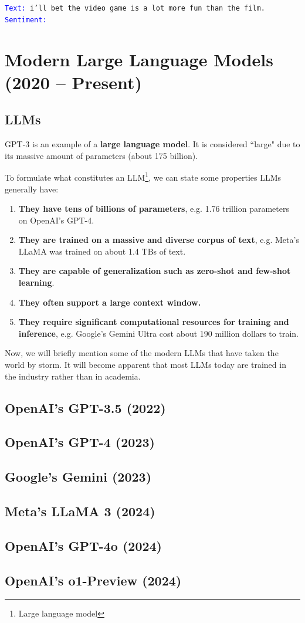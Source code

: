 \documentclass[11pt,twoside]{article}
\begin{document}
\texttt{\textcolor{blue}{Text:} i'll bet the video game is a lot more fun than the film. \\
\textcolor{blue}{Sentiment:}
}

\hrulefill

\section{Modern Large Language Models (2020 -- Present)}
\subsection{LLMs}
GPT-3 is an example of a \textbf{large language model}. It is considered ``large" due to its massive amount of parameters (about 175 billion).

To formulate what constitutes an LLM\footnote{Large language model}, we can state some properties LLMs generally have:
\begin{enumerate}
    \item \textbf{They have tens of billions of parameters}, e.g. 1.76 trillion parameters on OpenAI's GPT-4.
    \item \textbf{They are trained on a massive and diverse corpus of text}, e.g. Meta's LLaMA was trained on about 1.4 TBs of text.
    \item  \textbf{They are capable of generalization such as zero-shot and few-shot learning}.
    \item \textbf{They often support a large context window.}
    \item  \textbf{They require significant computational resources for training and inference}, e.g. Google's Gemini Ultra cost about 190 million dollars to train.
\end{enumerate}

Now, we will briefly mention some of the modern LLMs that have taken the world by storm. It will become apparent that most LLMs today are trained in the industry rather than in academia.

\subsection{OpenAI's GPT-3.5 (2022)}
\subsection{OpenAI's GPT-4 (2023)}
\subsection{Google's Gemini (2023)}
\subsection{Meta's LLaMA 3 (2024)}
\subsection{OpenAI's GPT-4o (2024)}
\subsection{OpenAI's o1-Preview (2024)}
\end{document}
